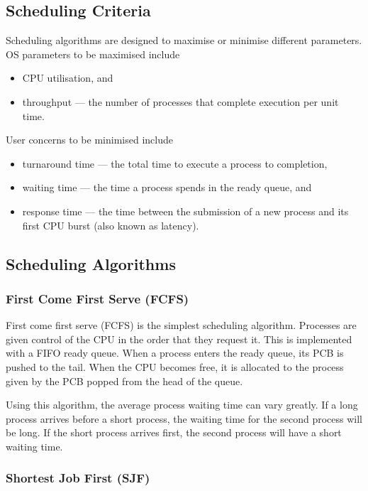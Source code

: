 \subsection{Scheduling Criteria}

Scheduling algorithms are designed to maximise or minimise different parameters.
OS parameters to be maximised include
\begin{itemize}
  \item CPU utilisation, and
  \item throughput --- the number of processes that complete execution per unit time.
\end{itemize}
User concerns to be minimised include
\begin{itemize}
  \item turnaround time --- the total time to execute a process to completion,
  \item waiting time --- the time a process spends in the ready queue, and
  \item response time --- the time between the submission of a new process and its first CPU burst (also known as latency).
\end{itemize}

\subsection{Scheduling Algorithms}

\subsubsection{First Come First Serve (FCFS)}

First come first serve (FCFS) is the simplest scheduling algorithm.
Processes are given control of the CPU in the order that they request it.
This is implemented with a FIFO ready queue.
When a process enters the ready queue, its PCB is pushed to the tail.
When the CPU becomes free, it is allocated to the process given by the PCB popped from the head of the queue.

Using this algorithm, the average process waiting time can vary greatly.
If a long process arrives before a short process, the waiting time for the second process will be long.
If the short process arrives first, the second process will have a short waiting time.

\subsubsection{Shortest Job First (SJF)}

